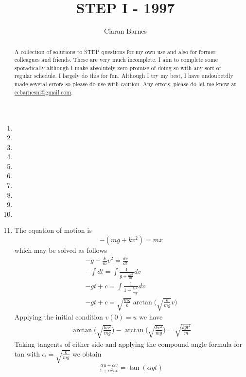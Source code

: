 \documentclass{article}
\title{STEP I - 1997}
\author{Ciaran Barnes}
\begin{document}
\maketitle

\begin{abstract}
	A collection of solutions to STEP questions for my own use and also for former colleagues and friends. These are very much incomplete. I aim to complete some sporadically although I make absolutely zero promise of doing so with any sort of regular schedule. I largely do this for fun. Although I try my best, I have undoubetdly made several errors so please do use with caution. Any errors, please do let me know at \url{ccbarnesni@gmail.com}.
\end{abstract}

\newpage

\begin{enumerate}
    \item 
    \item 
    \item 
    \item 
    \item 
    \item 
    \item 
    \item 
    \item 
    \item 
    \item The equation of motion is 
    \[
    -(mg+kv^2) = m\ddot{x}
    \]
    which may be solved as follows
    \begin{align*}
        -g-\frac{k}{m}v^2 = \frac{dv}{dt} \\
        -\int dt = \int \frac{1}{g+\frac{kv^2}{m}}dv \\
        -gt+c = \int \frac{1}{1+\frac{kv^2}{mg}} dv \\
        -gt+c = \sqrt{
       \frac{mg}{k}}\arctan{\Bigg( \sqrt{\frac{k}{mg}}v\Bigg)} 
    \end{align*}
    Applying the initial condition \(v(0)=u\) we have
    \begin{align*}
        \arctan{\Bigg( \sqrt{\frac{ku^2}{mg}}\Bigg)} - \arctan{\Bigg( \sqrt{\frac{kv^2}{mg}}\Bigg)} = \sqrt{\frac{kgt^2}{m}} 
    \end{align*}
    Taking tangents of either side and applying the compound angle formula for tan with \(\alpha =\sqrt{\frac{k}{mg}}\) we obtain
    \begin{align*}
        \frac{\alpha u - \alpha v}{1 + \alpha^2 uv} = \tan (\alpha gt)

\end{align*}
\end{enumerate}
\end{document}
